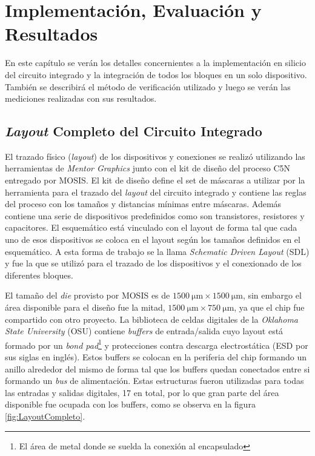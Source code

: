 \chapter{Implementación, Evaluación y Resultados}

En este capítulo se verán los detalles concernientes a la 
implementación en silicio del circuito integrado y la integración de 
todos los bloques en un solo dispositivo. También se 
describirá el método de verificación utilizado y luego se verán las 
mediciones realizadas con sus resultados.

\section{\emph{Layout} Completo del Circuito Integrado}

El trazado físico (\emph{layout}) de los dispositivos y conexiones se 
realizó utilizando las herramientas de \emph{Mentor Graphics} 
\cite{MentorCustomIC} junto con el kit de diseño del proceso C5N entregado por 
MOSIS. El kit de diseño define el set de máscaras a utilizar por la 
herramienta para el trazado del \emph{layout} del circuito integrado y 
contiene las reglas del proceso con los tamaños y distancias mínimas 
entre máscaras. Además contiene una serie de dispositivos 
predefinidos como son transistores, resistores y capacitores. El 
esquemático está vinculado con el layout de forma tal que cada uno 
de esos dispositivos se coloca en el layout según los tamaños definidos 
en el esquemático. A esta forma de trabajo se la llama \emph{Schematic 
Driven Layout} (SDL) y fue la que se utilizó para el trazado de los 
dispositivos y el conexionado de los diferentes bloques.

El tamaño del \emph{die} provisto por MOSIS es de 
\(\SI{1500}{\micro\meter}\times\SI{1500}{\micro\meter}\), sin embargo 
el área disponible para el diseño fue la mitad, 
\(\SI{1500}{\micro\meter}\times\SI{750}{\micro\meter}\), ya que el chip 
fue compartido con otro proyecto. La biblioteca de celdas digitales de 
la \emph{Oklahoma State University} (OSU) \cite{OSUstandardCells}
contiene \emph{buffers} de entrada/salida cuyo layout está formado por 
un \emph{bond pad}\footnote{El área de metal donde se suelda la 
conexión al encapsulado} y protecciones contra descarga 
electrostática (ESD por sus siglas en inglés). Estos buffers se colocan 
en la periferia del chip formando un anillo alrededor del mismo de 
forma tal que los buffers quedan conectados entre si formando un 
\emph{bus} de alimentación. Estas estructuras fueron utilizadas para 
todas las entradas y salidas digitales, 17 en total, por lo que gran 
parte del área disponible fue ocupada con los buffers, como se observa 
en la figura \ref{fig:LayoutCompleto}.

